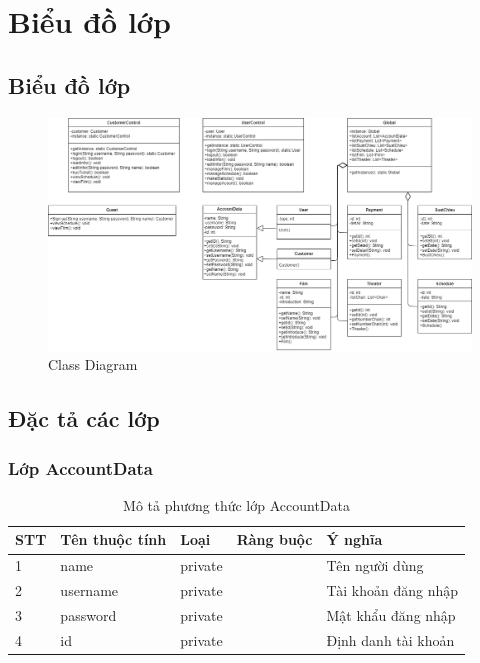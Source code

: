 \documentclass[a4paper, 12pt]{article}
\begin{document}
	\clearpage


\section{Biểu đồ lớp}

\subsection{Biểu đồ lớp}
\begin{figure}[H]
	\begin{center}
		\includegraphics[scale=0.37]{image/5.0.png}
		\caption{Class Diagram}
	\end{center}
\end{figure}

\subsection{Đặc tả các lớp}

\subsubsection{Lớp AccountData}
\begin{table}[h]
	\begin{center}
		\begin{tabular}{|l|l|l|l|l|}
		\hline
		STT & Tên thuộc tính & Loại   & Ràng buộc & Ý nghĩa             \\ \hline
		1   & name           & private &           & Tên người dùng      \\ \hline
		2   & username       & private &           & Tài khoản đăng nhập \\ \hline
		3   & password       & private &           & Mật khẩu đăng nhập  \\ \hline
		4   & id             & private &           & Định danh tài khoản \\ \hline
		\end{tabular}
		\caption{Mô tả phương thức lớp AccountData}
	\end{center}
\end{table}
\end{document}
